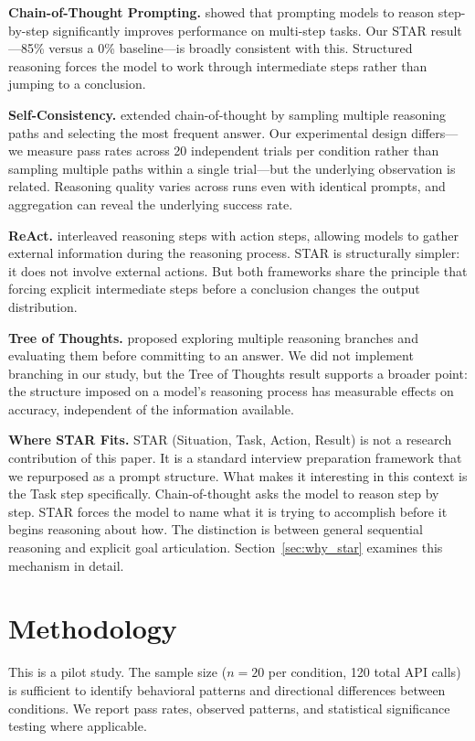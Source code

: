 \documentclass[11pt]{article}
\begin{document}
\textbf{Chain-of-Thought Prompting.} \citet{wei2022} showed that prompting models to reason step-by-step significantly improves performance on multi-step tasks. Our STAR result---85\% versus a 0\% baseline---is broadly consistent with this. Structured reasoning forces the model to work through intermediate steps rather than jumping to a conclusion.

\textbf{Self-Consistency.} \citet{wang2023} extended chain-of-thought by sampling multiple reasoning paths and selecting the most frequent answer. Our experimental design differs---we measure pass rates across 20 independent trials per condition rather than sampling multiple paths within a single trial---but the underlying observation is related. Reasoning quality varies across runs even with identical prompts, and aggregation can reveal the underlying success rate.

\textbf{ReAct.} \citet{yao2023react} interleaved reasoning steps with action steps, allowing models to gather external information during the reasoning process. STAR is structurally simpler: it does not involve external actions. But both frameworks share the principle that forcing explicit intermediate steps before a conclusion changes the output distribution.

\textbf{Tree of Thoughts.} \citet{yao2023tree} proposed exploring multiple reasoning branches and evaluating them before committing to an answer. We did not implement branching in our study, but the Tree of Thoughts result supports a broader point: the structure imposed on a model's reasoning process has measurable effects on accuracy, independent of the information available.

\textbf{Where STAR Fits.} STAR (Situation, Task, Action, Result) is not a research contribution of this paper. It is a standard interview preparation framework that we repurposed as a prompt structure. What makes it interesting in this context is the Task step specifically. Chain-of-thought asks the model to reason step by step. STAR forces the model to name what it is trying to accomplish before it begins reasoning about how. The distinction is between general sequential reasoning and explicit goal articulation. Section~\ref{sec:why_star} examines this mechanism in detail.

\section{Methodology}

This is a pilot study. The sample size ($n=20$ per condition, 120 total API calls) is sufficient to identify behavioral patterns and directional differences between conditions. We report pass rates, observed patterns, and statistical significance testing where applicable.
\end{document}
